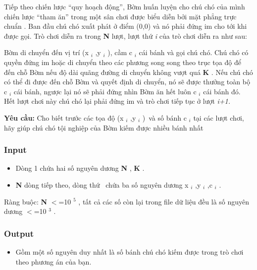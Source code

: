 



   Tiếp theo chiến lược “quy hoạch động”, Bờm huấn luyện cho chú chó của mình chiến lược “tham ăn” trong một sân chơi được biểu diễn bởi mặt phẳng trực chuẩn                                                   . Ban đầu chú chó xuất phát ở điểm (0,0) và nó phải đứng im cho tới khi được gọi. Trò chơi diễn ra trong   \textbf{    N   }   lượt, lượt thứ   \emph{    i   }   của trò chơi diễn ra như sau:  

   Bờm di chuyển đến vị trí (x   $_    i   $   ,y   $_    i   $   ), cầm c   $_    i   $   cái bánh và gọi chú chó. Chú chó có quyền đứng im hoặc di chuyển theo các phương song song theo trục tọa độ để đến chỗ Bờm nếu độ dài quãng đường di chuyển không vượt quá   \textbf{    K   }   . Nếu chú chó có thể đi được đến chỗ Bờm và quyết định di chuyển, nó sẽ được thưởng toàn bộ c   $_    i   $   cái bánh, ngược lại nó sẽ phải đứng nhìn Bờm ăn hết luôn c   $_    i   $   cái bánh đó. Hết lượt chơi này chú chó lại phải đứng im và trò chơi tiếp tục ở lượt   \emph{    i+1.   }

\textbf{    Yêu cầu:   }   Cho biết trước các tọa độ (x   $_    i   $   ,y   $_    i   $   ) và số bánh c   $_    i   $   tại các lượt chơi, hãy giúp chú chó tội nghiệp của Bờm kiếm được nhiều bánh nhất  

\subsubsection{   Input  }
\begin{itemize}
	\item     Dòng 1 chứa hai số nguyên dương    \textbf{     N    }    ,    \textbf{     K    }    .   
	\item \textbf{     N    }    dòng tiếp theo, dòng thứ     chứa ba số nguyên dương x    $_     i    $    ,y    $_     i    $    ,c    $_     i    $    .   
\end{itemize}

   Ràng buộc:   \textbf{    N   }   $<$=10   $^    5   $   , tất cả các số còn lại trong file dữ liệu đều là số nguyên dương $<$=10   $^    3   $   .  

\subsubsection{   Output  }
\begin{itemize}
	\item     Gồm một số nguyên duy nhất là số bánh chú chó kiếm được trong trò chơi theo phương án của bạn.   
\end{itemize}

